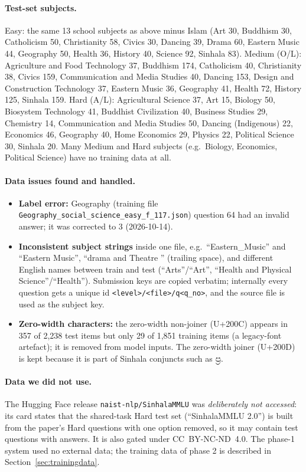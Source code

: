 \documentclass[10pt,a4paper]{article}
\newcommand{\si}[1]{{\sinhalafont #1}}
\begin{document}
\paragraph{Test-set subjects.} Easy: the same 13 school subjects as above minus Islam (Art 30, Buddhism 30,
Catholicism 50, Christianity 58, Civics 30, Dancing 39, Drama 60, Eastern Music 44, Geography 50, Health 36,
History 40, Science 92, Sinhala 83). Medium (O/L): Agriculture and Food Technology 37, Buddhism 174, Catholicism 40,
Christianity 38, Civics 159, Communication and Media Studies 40, Dancing 153, Design and Construction Technology 37,
Eastern Music 36, Geography 41, Health 72, History 125, Sinhala 159. Hard (A/L): Agricultural Science 37, Art 15,
Biology 50, Biosystem Technology 41, Buddhist Civilization 40, Business Studies 29, Chemistry 14, Communication and Media
Studies 50, Dancing (Indigenous) 22, Economics 46, Geography 40, Home Economics 29, Physics 22, Political Science 30,
Sinhala 20. Many Medium and Hard subjects (e.g.\ Biology, Economics, Political Science) have no training data at all.

\paragraph{Data issues found and handled.}
\begin{itemize}
\item \textbf{Label error:} Geography (training file \texttt{Geography\_social\_science\_easy\_f\_117.json}) question
64 had an invalid answer; it was corrected to 3 (2026-10-14).
\item \textbf{Inconsistent subject strings} inside one file, e.g.\ ``Eastern\_Music'' and ``Eastern Music'',
``drama and Theatre '' (trailing space), and different English names between train and test (``Arts''/``Art'',
``Health and Physical Science''/``Health''). Submission keys are copied verbatim; internally every question gets a
unique id \texttt{<level>/<file>/q<q\_no>}, and the source file is used as the subject key.
\item \textbf{Zero-width characters:} the zero-width non-joiner (U+200C) appears in 357 of 2,238 test items but only 29
of 1,851 training items (a legacy-font artefact); it is removed from model inputs. The zero-width joiner (U+200D) is
kept because it is part of Sinhala conjuncts such as \si{ප්‍ර}.
\end{itemize}

\paragraph{Data we did not use.} The Hugging Face release \texttt{naist-nlp/SinhalaMMLU} was \emph{deliberately not
accessed}: its card states that the shared-task Hard test set (``SinhalaMMLU 2.0'') is built from the paper's Hard
questions with one option removed, so it may contain test questions with answers. It is also gated under
CC~BY-NC-ND~4.0. The phase-1 system used no external data; the training data of phase 2 is described in
Section~\ref{sec:trainingdata}.
\end{document}
